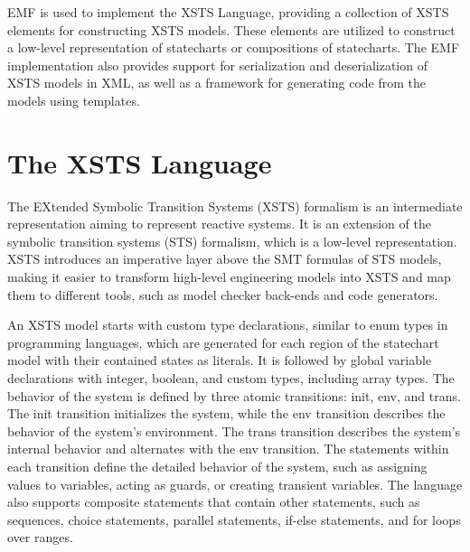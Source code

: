EMF is used to implement the XSTS Language, providing a collection of XSTS elements for constructing XSTS models. These elements are utilized to construct a low-level representation of statecharts or compositions of statecharts. The EMF implementation also provides support for serialization and deserialization of XSTS models in XML, as well as a framework for generating code from the models using templates.

\section{The XSTS Language}

The EXtended Symbolic Transition Systems \cite{XSTS} (XSTS) formalism is an intermediate representation aiming to represent reactive systems. It is an extension of the symbolic transition systems (STS) formalism, which is a low-level representation. XSTS introduces an imperative layer above the SMT formulas of STS models, making it easier to transform high-level engineering models into XSTS and map them to different tools, such as model checker back-ends and code generators.

An XSTS model starts with custom type declarations, similar to enum types in programming languages, which are generated for each region of the statechart model with their contained states as literals. It is followed by global variable declarations with integer, boolean, and custom types, including array types. The behavior of the system is defined by three atomic transitions: init, env, and trans. The init transition initializes the system, while the env transition describes the behavior of the system's environment. The trans transition describes the system's internal behavior and alternates with the env transition. The statements within each transition define the detailed behavior of the system, such as assigning values to variables, acting as guards, or creating transient variables. The language also supports composite statements that contain other statements, such as sequences, choice statements, parallel statements, if-else statements, and for loops over ranges.